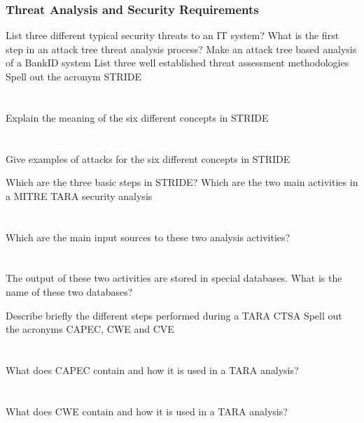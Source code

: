 \section{Threat Analysis and Security Requirements}\label{sec:Threat_Analysis-Security_Requirements}
\begin{questions}
\question{} List three different typical security threats to an IT system?
\question{} What is the first step in an attack tree threat analysis process?
\question{} Make an attack tree based analysis of a BankID system
\question{} List three well established threat assessment methodologies
\question{} Spell out the acronym STRIDE
  \begin{parts}
  \part{} Explain the meaning of the six different concepts in STRIDE
  \part{} Give examples of attacks for the six different concepts in STRIDE
  \end{parts}

\question{} Which are the three basic steps in STRIDE?\@
\question{} Which are the two main activities in a MITRE TARA security analysis
  \begin{parts}
  \part{} Which are the main input sources to these two analysis
    activities?
  \part{} The output of these two activities are stored in special databases. What is the name of these two databases?
  \end{parts}

\question{} Describe briefly the different steps performed during a TARA CTSA
\question{} Spell out the acronyms CAPEC, CWE and CVE
  \begin{parts}
  \part{} What does CAPEC contain and how it is used in a TARA analysis?
  \part{} What does CWE contain and how it is used in a TARA analysis?

\end{parts}
\end{questions}

